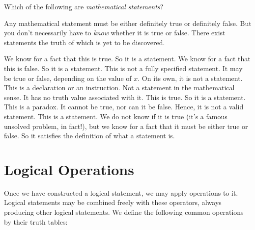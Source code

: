 \begin{exercise}
  [Statements]
  Which of the following are \emph{mathematical statements}?
  \begin{enumerate}
  \end{enumerate}

  \begin{hint}
    Any mathematical statement must be either definitely true or definitely
    false. But you don't necessarily have to \emph{know} whether it is true or
    false. There exist statements the truth of which is yet to be discovered.
  \end{hint}

  \begin{sol}
    \begin{enumerate}
       We know for a fact that this is true. So it is a statement.
       We know for a fact that this is false. So it is a statement.
       This is not a fully specified statement. It may be true or
            false, depending on the value of \(x\). On its own, it is not a statement.
       This is a declaration or an instruction. Not a
            statement in the mathematical sense. It has no truth value associated
            with it.
       This is true. So it
            is a statement.
       This is a paradox. It cannot be
            true, nor can it be false. Hence, it is not a valid statement.
            This is a statement. We do not know if it is true (it's a famous
            unsolved problem, in fact!), but we know for a fact that it must be
            either true or false. So it satisfies the definition of what a
            statement is.
    \end{enumerate}
  \end{sol}
\end{exercise}

\section{Logical Operations}
Once we have constructed a logical statement, we may apply operations to it.
Logical statements may be combined freely with these operators, always producing
other logical statements. We define the following common operations by their
truth tables:

